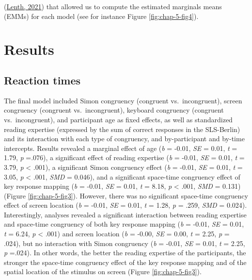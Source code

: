 \documentclass[
  a4paper,12pt,twoside,onecolumn,openright,final,oldfontcommands]{memoir}
\begin{document}
(\protect\hyperlink{ref-lenth_emmeans_2021}{Lenth, 2021}) that allowed us to compute the estimated marginals means (EMMs) for each model (see for instance Figure \ref{fig:chap-5-fig4}).

\hypertarget{results-4}{%
\section{Results}\label{results-4}}

\hypertarget{reaction-times}{%
\subsection{Reaction times}\label{reaction-times}}

The final model included Simon congruency (congruent vs.~incongruent), screen congruency (congruent vs.~incongruent), keyboard congruency (congruent vs.~incongruent), and participant age as fixed effects, as well as standardized reading expertise (expressed by the sum of correct responses in the SLS-Berlin) and its interaction with each type of congruency, and by-participant and by-time intercepts. Results revealed a marginal effect of age (\emph{b} = -0.01, \emph{SE} = 0.01, \emph{t} = 1.79, \emph{p} =.076), a significant effect of reading expertise (\emph{b} = -0.01, \emph{SE} = 0.01, \emph{t} = 3.79, \emph{p} \textless{} .001), a significant Simon congruency effect (\emph{b} = -0.01, \emph{SE} = 0.01, \emph{t} = 3.05, \emph{p} \textless{} .001, \emph{SMD} = 0.046), and a significant space-time congruency effect of key response mapping (\emph{b} = -0.01, \emph{SE} = 0.01, \emph{t} = 8.18, \emph{p} \textless{} .001, \emph{SMD} = 0.131) (Figure \ref{fig:chap-5-fig3}). However, there was no significant space-time congruency effect of screen location (\emph{b} = -0.01, \emph{SE} = 0.01, \emph{t} = 1.28, \emph{p} = .259, \emph{SMD} = 0.024). Interestingly, analyses revealed a significant interaction between reading expertise and space-time congruency of both key response mapping (\emph{b} = -0.01, \emph{SE} = 0.01, \emph{t} = 6.24, \emph{p} \textless{} .001) and screen location (\emph{b} = -0.00, \emph{SE} = 0.00, \emph{t} = 2.25, \emph{p} = .024), but no interaction with Simon congruency (\emph{b} = -0.01, \emph{SE} = 0.01, \emph{t} = 2.25, \emph{p} =.024). In other words, the better the reading expertise of the participants, the stronger the space-time congruency effect of the key response mapping and of the spatial location of the stimulus on screen (Figure \ref{fig:chap-5-fig3}).
\end{document}
